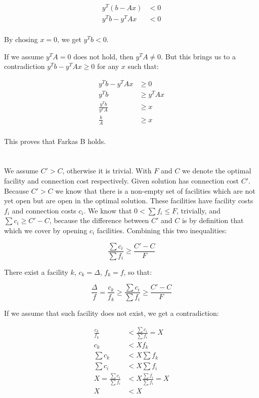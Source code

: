 \documentclass[a4paper,11pt,oneside,onecolumn]{article}
\begin{document}
\begin{align*}
y^T(b - Ax) & < 0 \\
y^Tb - y^TAx & < 0 \\
\end{align*}

By chosing $x=0$, we get $y^Tb < 0$.

If we assume $y^TA = 0$ does not hold, then $y^TA \ne 0$. But this brings us to a contradiction $ y^Tb - y^TAx \ge 0 $
for any $x$ such that:

\begin{align*}
y^Tb - y^TAx & \ge 0 \\
y^Tb & \ge y^TAx \\
\frac{y^Tb}{y^TA} & \ge x \\
\frac{b}{A} & \ge x \\
\end{align*}

This proves that Farkas B holds.

\section{}

\subsection{}

We assume $C' > C$, otherwise it is trivial. With $F$ and $C$ we denote the optimal facility and connection cost respectively.
Given solution has connection cost $C'$. Because $C' > C$ we know that there is a non-empty set of facilities which are not
yet open but are open in the optimal solution. These facilities have facility costs $f_i$ and connection costs $c_i$.
We know that $ 0 < \sum f_i \le F $, trivially, and $ \sum c_i \ge C' - C $, because the difference between $C'$ and $C$ is
by definition that which we cover by opening $c_i$ facilities. Combining this two inequalities:

$$
\frac{\sum c_i}{\sum f_i} \ge \frac{C' - C}{F}
$$

There exist a facility $k$, $c_k = \Delta$, $f_k = f$, so that:

$$
\frac{\Delta}{f} = \frac{c_k}{f_k} \ge \frac{\sum c_i}{\sum f_i} \ge \frac{C' - C}{F}
$$

If we assume that such facility does not exist, we get a contradiction:

\begin{align*}
\frac{c_k}{f_k} & < \frac{\sum c_i}{\sum f_i} = X \\
c_k & < X f_k \\
\sum c_k & < X \sum f_k \\
\sum c_i & < X \sum f_i \\
X = \frac{\sum c_i}{\sum f_i} & < X \frac{\sum f_i}{\sum f_i} = X \\
X & < X \\
\end{align*}
\end{document}

